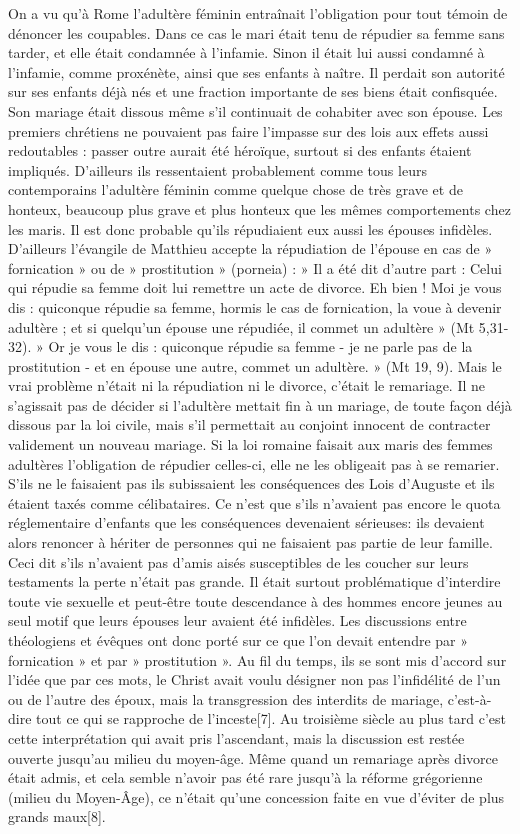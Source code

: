  On a vu qu'à Rome l'adultère féminin entraînait l'obligation pour tout témoin de dénoncer les coupables. Dans ce cas le mari était tenu de répudier sa femme sans tarder, et elle était condamnée à l'infamie. Sinon il était lui aussi condamné à l'infamie, comme proxénète, ainsi que ses enfants à naître. Il perdait son autorité sur ses enfants déjà nés et une fraction importante de ses biens était confisquée. Son mariage était dissous même s'il continuait de cohabiter avec son épouse. Les premiers chrétiens ne pouvaient pas faire l'impasse sur des lois aux effets aussi redoutables : passer outre aurait été héroïque, surtout si des enfants étaient impliqués. D'ailleurs ils ressentaient probablement comme tous leurs contemporains l'adultère féminin comme quelque chose de très grave et de honteux, beaucoup plus grave et plus honteux que les mêmes comportements chez les maris. Il est donc probable qu'ils répudiaient eux aussi les épouses infidèles. D'ailleurs l'évangile de Matthieu accepte la répudiation de l'épouse en cas de » fornication » ou de » prostitution » (porneia) : » Il a été dit d'autre part : Celui qui répudie sa femme doit lui remettre un acte de divorce. Eh bien ! Moi je vous dis : quiconque répudie sa femme, hormis le cas de fornication, la voue à devenir adultère ; et si quelqu'un épouse une répudiée, il commet un adultère » (Mt 5,31-32). » Or je vous le dis : quiconque répudie sa femme - je ne parle pas de la prostitution - et en épouse une autre, commet un adultère. » (Mt 19, 9). 
 Mais le vrai problème n'était ni la répudiation ni le divorce, c'était le remariage. Il ne s'agissait pas de décider si l'adultère mettait fin à un mariage, de toute façon déjà dissous par la loi civile, mais s'il permettait au conjoint innocent de contracter validement un nouveau mariage. Si la loi romaine faisait aux maris des femmes adultères l'obligation de répudier celles-ci, elle ne les obligeait pas à se remarier. S'ils ne le faisaient pas ils subissaient les conséquences des Lois d'Auguste et ils étaient taxés comme célibataires. Ce n'est que s'ils n'avaient pas encore le quota réglementaire d'enfants que les conséquences devenaient sérieuses: ils devaient alors renoncer à hériter de personnes qui ne faisaient pas partie de leur famille. Ceci dit s'ils n'avaient pas d'amis aisés susceptibles de les coucher sur leurs testaments la perte n'était pas grande. Il était surtout problématique d'interdire toute vie sexuelle et peut-être toute descendance à des hommes encore jeunes au seul motif que leurs épouses leur avaient été infidèles. 
 Les discussions entre théologiens et évêques ont donc porté sur ce que l'on devait entendre par » fornication » et par » prostitution ». Au fil du temps, ils se sont mis d'accord sur l'idée que par ces mots, le Christ avait voulu désigner non pas l'infidélité de l'un ou de l'autre des époux, mais la transgression des interdits de mariage, c'est-à-dire tout ce qui se rapproche de l'inceste[7]. Au troisième siècle au plus tard c'est cette interprétation qui avait pris l'ascendant, mais la discussion est restée ouverte jusqu'au milieu du moyen-âge. Même quand un remariage après divorce était admis, et cela semble n'avoir pas été rare jusqu'à la réforme grégorienne (milieu du Moyen-Âge), ce n'était qu'une concession faite en vue d'éviter de plus grands maux[8].
